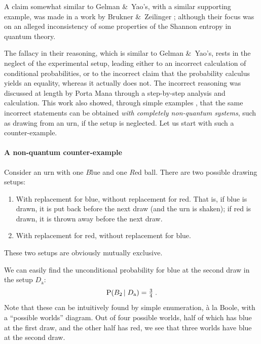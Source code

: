 \documentclass[\ifafour a4paper,12pt,\else a5paper,10pt,\fi%
onecolumn,oneside,article,%
british%
]{memoir}
\theoremstyle{remark}
\theoremstyle{innote}
\newcommand*{\citep}{\parencites}%
\newcommand*{\citey}{\parencites*}
\newcommand*{\amp}{\&}
\newcommand*{\p}{\mathrm{P}}%
\renewcommand*{\|}[1][]{\nonscript\,#1\vert\nonscript\;\mathopen{}}
\newcommand*{\sect}{\S}%
\newcommand*{\yDa}{D_{\textrm{a}}}
\begin{document}
A claim somewhat similar to Gelman \amp\ Yao's, with a similar supporting
example, was made in a work by Brukner \amp\ Zeilinger
\citey{brukneretal2001}; although their focus was on an alleged
inconsistency of some properties of the Shannon entropy in quantum theory.

The fallacy in their reasoning, which is similar to Gelman \amp\ Yao's,
rests in the neglect of the experimental setup, leading either to an
incorrect calculation of conditional probabilities, or to the incorrect
claim that the probability calculus yields an equality, whereas it actually
does not. The incorrect reasoning was discussed at length by Porta Mana
\citey{portamana2003_r2004} through a step-by-step analysis and
calculation. This work also showed, through simple examples
\citep[\sect~IV]{portamana2003_r2004}, that the same incorrect
statements can be obtained \emph{with completely non-quantum systems}, such
as drawing from an urn, if the setup is neglected. Let us start with such a
counter-example.

\bigskip

\paragraph{A non-quantum counter-example}

Consider an urn with one $B$lue and one $R$ed ball. There are two possible
drawing setups:
\begin{enumerate}[label=$D_{\textrm{\alph*}}$]
\item\label{item:repB} With replacement for blue, without replacement for
  red. That is, if blue is drawn, it is put back before the next draw (and
  the urn is shaken); if red is drawn, it is thrown away before the next
  draw.
\item \label{item:repR} With replacement for red, without replacement for blue.
\end{enumerate}
These two setups are obviously mutually exclusive.

We can easily find the unconditional probability for blue at the
second draw in the setup $\yDa$:
\begin{equation}
  \label{eq:A_red2}
  \p(B_{2} \| \yDa) = \tfrac{3}{4} \;.
\end{equation}
Note that these can be intuitively found by simple enumeration, \`a la
Boole, with a \enquote{possible worlds} diagram. Out of four possible
worlds, half of which has blue at the first draw, and the other half has
red, we see that three worlds have blue at the second draw.
\end{document}

